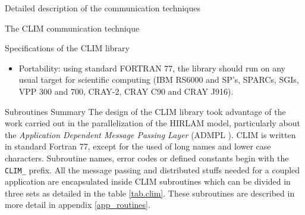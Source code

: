 \begin{section}{Detailed description of the communication techniques}
\begin{subsection}{The CLIM communication technique}
\begin{subsubsection}{Specifications of the CLIM library}
\begin{itemize}
\item {Portability}:
using standard FORTRAN 77, the library should run on any usual target for 
scientific computing (IBM RS6000 and SP's, SPARCs, SGIs, VPP 300 and 700,
CRAY-2, CRAY C90 and CRAY J916).

\end{itemize}

\end{subsubsection}


%
\begin{subsubsection}{Subroutines Summary}
%
The design of the CLIM library took advantage of the work carried out in
the parallelization of the HIRLAM model, particularly about
the {\it Application Dependent Message Passing Layer} (ADMPL
\cite{hirlam}).
CLIM is written in standard Fortran 77, except for the used of long
names and lower case characters. Subroutine names, error codes
or defined constants begin with the {\tt CLIM\_} prefix.
All the message passing and distributed
stuffs needed for a coupled application are encapsulated inside CLIM
subroutines which can be divided in three sets as detailed in
the table \ref{tab.clim}. These subroutines are described in more detail
in appendix \ref{app_routines}.


\end{subsubsection}
\end{subsection}
\end{section}
